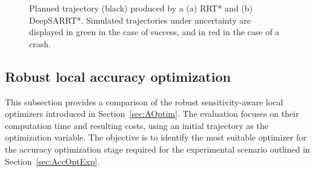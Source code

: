 


\begin{figure} [htp]
    \centering
    \caption{Planned trajectory (black) produced by a (a) RRT* and (b) DeepSARRT*. 
    Simulated trajectories under uncertainty are displayed in green in the case of success, and in red in the case of a crash.}%
    \label{fig: simu window}%
\end{figure}

\subsection{Robust local accuracy optimization} \label{sec:AccOptSimu}

This subsection provides a comparison of the robust sensitivity-aware local optimizers introduced in Section~\ref{sec:AOptim}. 
The evaluation focuses on their computation time and resulting costs, using an initial trajectory as the optimization variable.
The objective is to identify the most suitable optimizer for the accuracy optimization stage required for the experimental scenario outlined in Section~\ref{sec:AccOptExp}.

